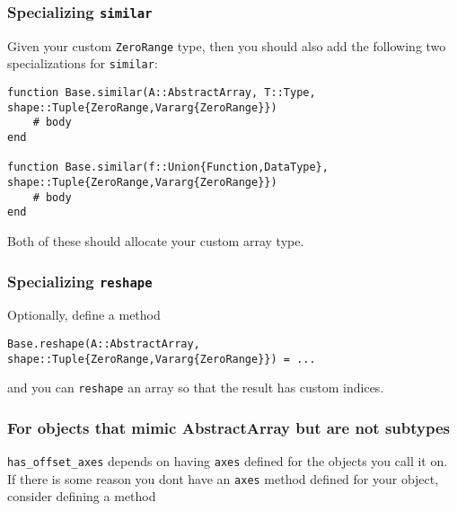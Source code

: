 \hypertarget{5556461946249659648}{}


\subsubsection{Specializing \texttt{similar}}



Given your custom \texttt{ZeroRange} type, then you should also add the following two specializations for \texttt{similar}:




\begin{verbatim}
function Base.similar(A::AbstractArray, T::Type, shape::Tuple{ZeroRange,Vararg{ZeroRange}})
    # body
end

function Base.similar(f::Union{Function,DataType}, shape::Tuple{ZeroRange,Vararg{ZeroRange}})
    # body
end
\end{verbatim}



Both of these should allocate your custom array type.



\hypertarget{16440701718956142132}{}


\subsubsection{Specializing \texttt{reshape}}



Optionally, define a method




\begin{lstlisting}
Base.reshape(A::AbstractArray, shape::Tuple{ZeroRange,Vararg{ZeroRange}}) = ...
\end{lstlisting}



and you can \texttt{reshape} an array so that the result has custom indices.



\hypertarget{18101383726856776769}{}


\subsubsection{For objects that mimic AbstractArray but are not subtypes}



\texttt{has\_offset\_axes} depends on having \texttt{axes} defined for the objects you call it on. If there is some reason you don{\textquotesingle}t have an \texttt{axes} method defined for your object, consider defining a method




